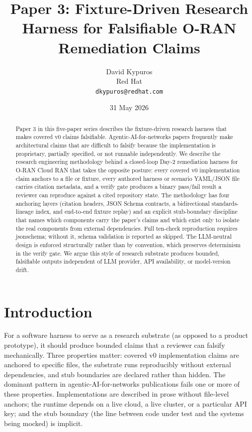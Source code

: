 \documentclass[twocolumn,10pt,a4paper]{article}
\title{Paper 3: Fixture-Driven Research Harness for Falsifiable O-RAN Remediation Claims}
\author{David Kypuros \\
\small Red Hat \\
\small \texttt{dkypuros@redhat.com}}
\date{31 May 2026}
\begin{document}
\maketitle

\begin{abstract}
Paper 3 in this five-paper series describes the fixture-driven research harness that makes covered v0 claims falsifiable. Agentic-AI-for-networks papers frequently make architectural claims that are difficult to falsify because the implementation is proprietary, partially specified, or not runnable independently. We describe the research engineering methodology behind a closed-loop Day-2 remediation harness for O-RAN Cloud RAN that takes the opposite posture: every covered v0 implementation claim anchors to a file or fixture, every authored harness or scenario YAML/JSON file carries citation metadata, and a verify gate produces a binary pass/fail result a reviewer can reproduce against a cited repository state. The methodology has four anchoring layers (citation headers, JSON Schema contracts, a bidirectional standards-lineage index, and end-to-end fixture replay) and an explicit stub-boundary discipline that names which components carry the paper's claims and which exist only to isolate the real components from external dependencies. Full ten-check reproduction requires jsonschema; without it, schema validation is reported as skipped. The LLM-neutral design is enforced structurally rather than by convention, which preserves determinism in the verify gate. We argue this style of research substrate produces bounded, falsifiable outputs independent of LLM provider, API availability, or model-version drift.
\end{abstract}

\section{Introduction}

For a software harness to serve as a research substrate (as opposed to a product prototype), it should produce bounded claims that a reviewer can falsify mechanically. Three properties matter: covered v0 implementation claims are anchored to specific files, the substrate runs reproducibly without external dependencies, and stub boundaries are declared rather than hidden. The dominant pattern in agentic-AI-for-networks publications fails one or more of these properties. Implementations are described in prose without file-level anchors; the runtime depends on a live cloud, a live cluster, or a particular API key; and the stub boundary (the line between code under test and the systems being mocked) is implicit.
\end{document}
